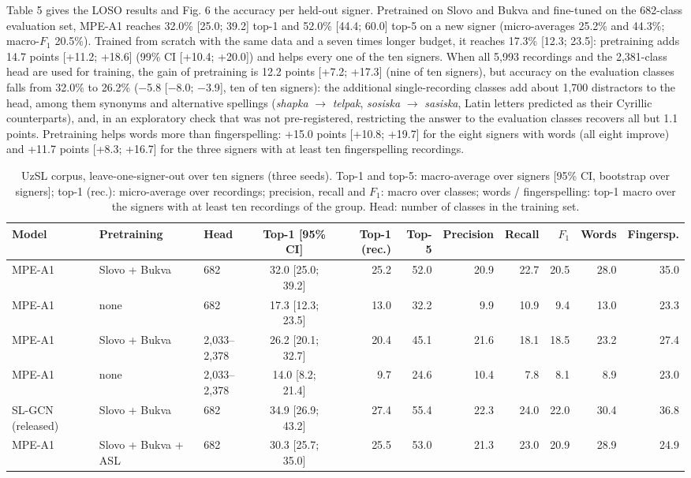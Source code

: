\documentclass[a4paper,fleqn]{cas-dc}
\begin{document}
Table 5 gives the LOSO results and Fig. 6 the accuracy per held-out signer. Pretrained on Slovo and Bukva and fine-tuned on the 682-class evaluation set, MPE-A1 reaches 32.0\% {[}25.0; 39.2{]} top-1 and 52.0\% {[}44.4; 60.0{]} top-5 on a new signer (micro-averages 25.2\% and 44.3\%; macro-\(F_1\) 20.5\%). Trained from scratch with the same data and a seven times longer budget, it reaches 17.3\% {[}12.3; 23.5{]}: pretraining adds 14.7 points {[}+11.2; +18.6{]} (99\% CI {[}+10.4; +20.0{]}) and helps every one of the ten signers. When all 5,993 recordings and the 2,381-class head are used for training, the gain of pretraining is 12.2 points {[}+7.2; +17.3{]} (nine of ten signers), but accuracy on the evaluation classes falls from 32.0\% to 26.2\% ($-$5.8 {[}$-$8.0; $-$3.9{]}, ten of ten signers): the additional single-recording classes add about 1,700 distractors to the head, among them synonyms and alternative spellings (\emph{shapka} $\rightarrow$ \emph{telpak}, \emph{sosiska} $\rightarrow$ \emph{sasiska}, Latin letters predicted as their Cyrillic counterparts), and, in an exploratory check that was not pre-registered, restricting the answer to the evaluation classes recovers all but 1.1 points. Pretraining helps words more than fingerspelling: +15.0 points {[}+10.8; +19.7{]} for the eight signers with words (all eight improve) and +11.7 points {[}+8.3; +16.7{]} for the three signers with at least ten fingerspelling recordings.

\begin{table}[t]
\caption{UzSL corpus, leave-one-signer-out over ten signers (three seeds). Top-1 and top-5: macro-average over signers [95\% CI, bootstrap over signers]; top-1 (rec.): micro-average over recordings; precision, recall and $F_1$: macro over classes; words / fingerspelling: top-1 macro over the signers with at least ten recordings of the group. Head: number of classes in the training set.}\label{tab:loso}
\scriptsize\setlength{\tabcolsep}{3pt}
\centering
\begin{tabular}{lllcrrrrrrr}
\toprule
\textbf{Model} & \textbf{Pretraining} & \textbf{Head} & \textbf{Top-1 [95\% CI]} & \textbf{Top-1 (rec.)} & \textbf{Top-5} & \textbf{Precision} & \textbf{Recall} & \textbf{$F_1$} & \textbf{Words} & \textbf{Fingersp.} \\
\midrule
MPE-A1 & Slovo + Bukva & 682 & 32.0 [25.0; 39.2] & 25.2 & 52.0 & 20.9 & 22.7 & 20.5 & 28.0 & 35.0 \\
MPE-A1 & none & 682 & 17.3 [12.3; 23.5] & 13.0 & 32.2 & 9.9 & 10.9 & 9.4 & 13.0 & 23.3 \\
MPE-A1 & Slovo + Bukva & 2,033–2,378 & 26.2 [20.1; 32.7] & 20.4 & 45.1 & 21.6 & 18.1 & 18.5 & 23.2 & 27.4 \\
MPE-A1 & none & 2,033–2,378 & 14.0 [8.2; 21.4] & 9.7 & 24.6 & 10.4 & 7.8 & 8.1 & 8.9 & 23.0 \\
SL-GCN (released) & Slovo + Bukva & 682 & 34.9 [26.9; 43.2] & 27.4 & 55.4 & 22.3 & 24.0 & 22.0 & 30.4 & 36.8 \\
MPE-A1 & Slovo + Bukva + ASL & 682 & 30.3 [25.7; 35.0] & 25.5 & 53.0 & 21.3 & 23.0 & 20.9 & 28.9 & 24.9 \\
\bottomrule
\end{tabular}
\end{table}
\end{document}
